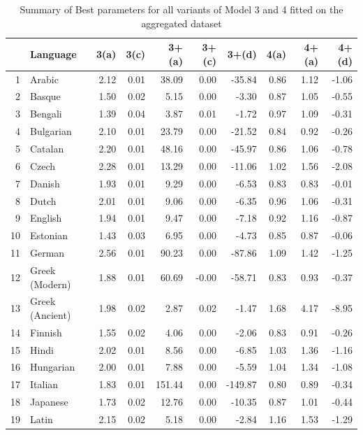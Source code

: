 \documentclass[a4paper]{article}
\begin{document}
\begin{table}[hbtp]
	\centering
	\caption{Summary of Best parameters for all variants of Model 3 and 4 fitted on the aggregated dataset}
	\begin{tabular}{rlrrrrrrrr}
		\hline
		& Language & 3(a) & 3(c) & 3+(a) & 3+(c) & 3+(d) & 4(a) & 4+(a) & 4+(d) \\ 
		\hline
		1 & Arabic & 2.12 & 0.01 & 38.09 & 0.00 & -35.84 & 0.86 & 1.12 & -1.06 \\ 
		2 & Basque & 1.50 & 0.02 & 5.15 & 0.00 & -3.30 & 0.87 & 1.05 & -0.55 \\ 
		3 & Bengali & 1.39 & 0.04 & 3.87 & 0.01 & -1.72 & 0.97 & 1.09 & -0.31 \\ 
		4 & Bulgarian & 2.10 & 0.01 & 23.79 & 0.00 & -21.52 & 0.84 & 0.92 & -0.26 \\ 
		5 & Catalan & 2.20 & 0.01 & 48.16 & 0.00 & -45.97 & 0.86 & 1.06 & -0.78 \\ 
		6 & Czech & 2.28 & 0.01 & 13.29 & 0.00 & -11.06 & 1.02 & 1.56 & -2.08 \\ 
		7 & Danish & 1.93 & 0.01 & 9.29 & 0.00 & -6.53 & 0.83 & 0.83 & -0.01 \\ 
		8 & Dutch & 2.01 & 0.01 & 9.06 & 0.00 & -6.35 & 0.96 & 1.06 & -0.31 \\ 
		9 & English & 1.94 & 0.01 & 9.47 & 0.00 & -7.18 & 0.92 & 1.16 & -0.87 \\ 
		10 & Estonian & 1.43 & 0.03 & 6.95 & 0.00 & -4.73 & 0.85 & 0.87 & -0.06 \\ 
		11 & German & 2.56 & 0.01 & 90.23 & 0.00 & -87.86 & 1.09 & 1.42 & -1.25 \\ 
		12 & Greek (Modern) & 1.88 & 0.01 & 60.69 & -0.00 & -58.71 & 0.83 & 0.93 & -0.37 \\ 
		13 & Greek (Ancient) & 1.98 & 0.02 & 2.87 & 0.02 & -1.47 & 1.68 & 4.17 & -8.95 \\ 
		14 & Finnish & 1.55 & 0.02 & 4.06 & 0.00 & -2.06 & 0.83 & 0.91 & -0.26 \\ 
		15 & Hindi & 2.02 & 0.01 & 8.56 & 0.00 & -6.85 & 1.03 & 1.36 & -1.16 \\ 
		16 & Hungarian & 2.00 & 0.01 & 7.88 & 0.00 & -5.59 & 1.04 & 1.34 & -1.08 \\ 
		17 & Italian & 1.83 & 0.01 & 151.44 & 0.00 & -149.87 & 0.80 & 0.89 & -0.34 \\ 
		18 & Japanese & 1.73 & 0.02 & 12.76 & 0.00 & -10.35 & 0.87 & 1.01 & -0.44 \\ 
		19 & Latin & 2.15 & 0.02 & 5.18 & 0.00 & -2.84 & 1.16 & 1.53 & -1.29 \\ 

\end{tabular}
\end{table}
\end{document}
